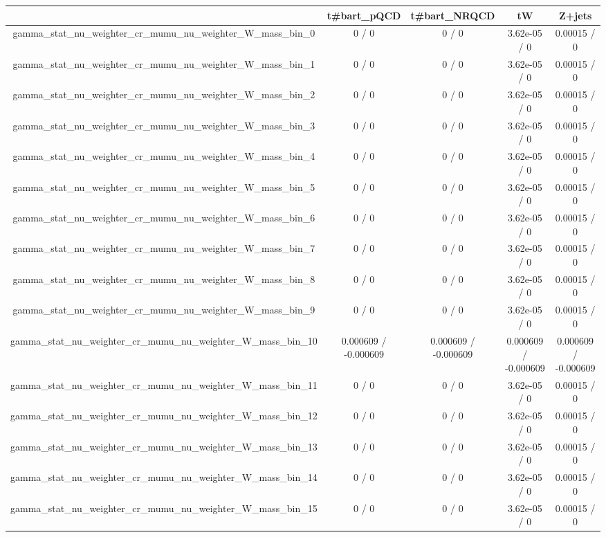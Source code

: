 \documentclass[10pt]{article}
\begin{document}
\begin{table}[htbp]
\begin{center}
\begin{tabular}{|c|c|c|c|c|}
\hline 
      & t#bar{t}_{pQCD}      & t#bar{t}_{NRQCD}      & tW      & Z+jets \\ 
\hline 
  gamma_stat_nu_weighter_cr_mumu_nu_weighter_W_mass_bin_0 & 0 / 0 & 0 / 0 & 3.62e-05 / 0 & 0.00015 / 0 \\ 
  gamma_stat_nu_weighter_cr_mumu_nu_weighter_W_mass_bin_1 & 0 / 0 & 0 / 0 & 3.62e-05 / 0 & 0.00015 / 0 \\ 
  gamma_stat_nu_weighter_cr_mumu_nu_weighter_W_mass_bin_2 & 0 / 0 & 0 / 0 & 3.62e-05 / 0 & 0.00015 / 0 \\ 
  gamma_stat_nu_weighter_cr_mumu_nu_weighter_W_mass_bin_3 & 0 / 0 & 0 / 0 & 3.62e-05 / 0 & 0.00015 / 0 \\ 
  gamma_stat_nu_weighter_cr_mumu_nu_weighter_W_mass_bin_4 & 0 / 0 & 0 / 0 & 3.62e-05 / 0 & 0.00015 / 0 \\ 
  gamma_stat_nu_weighter_cr_mumu_nu_weighter_W_mass_bin_5 & 0 / 0 & 0 / 0 & 3.62e-05 / 0 & 0.00015 / 0 \\ 
  gamma_stat_nu_weighter_cr_mumu_nu_weighter_W_mass_bin_6 & 0 / 0 & 0 / 0 & 3.62e-05 / 0 & 0.00015 / 0 \\ 
  gamma_stat_nu_weighter_cr_mumu_nu_weighter_W_mass_bin_7 & 0 / 0 & 0 / 0 & 3.62e-05 / 0 & 0.00015 / 0 \\ 
  gamma_stat_nu_weighter_cr_mumu_nu_weighter_W_mass_bin_8 & 0 / 0 & 0 / 0 & 3.62e-05 / 0 & 0.00015 / 0 \\ 
  gamma_stat_nu_weighter_cr_mumu_nu_weighter_W_mass_bin_9 & 0 / 0 & 0 / 0 & 3.62e-05 / 0 & 0.00015 / 0 \\ 
  gamma_stat_nu_weighter_cr_mumu_nu_weighter_W_mass_bin_10 & 0.000609 / -0.000609 & 0.000609 / -0.000609 & 0.000609 / -0.000609 & 0.000609 / -0.000609 \\ 
  gamma_stat_nu_weighter_cr_mumu_nu_weighter_W_mass_bin_11 & 0 / 0 & 0 / 0 & 3.62e-05 / 0 & 0.00015 / 0 \\ 
  gamma_stat_nu_weighter_cr_mumu_nu_weighter_W_mass_bin_12 & 0 / 0 & 0 / 0 & 3.62e-05 / 0 & 0.00015 / 0 \\ 
  gamma_stat_nu_weighter_cr_mumu_nu_weighter_W_mass_bin_13 & 0 / 0 & 0 / 0 & 3.62e-05 / 0 & 0.00015 / 0 \\ 
  gamma_stat_nu_weighter_cr_mumu_nu_weighter_W_mass_bin_14 & 0 / 0 & 0 / 0 & 3.62e-05 / 0 & 0.00015 / 0 \\ 
  gamma_stat_nu_weighter_cr_mumu_nu_weighter_W_mass_bin_15 & 0 / 0 & 0 / 0 & 3.62e-05 / 0 & 0.00015 / 0 \\ 

\end{tabular}
\end{center}
\end{table}
\end{document}
